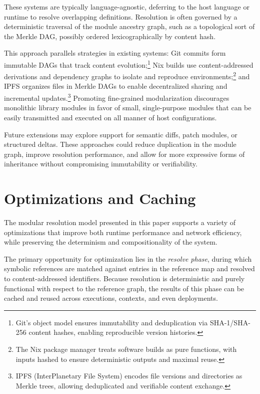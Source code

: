 \documentclass[sigplan,screen]{acmart}
\begin{document}
These systems are typically language-agnostic, deferring to the host language or runtime to resolve overlapping definitions. Resolution is often governed by a deterministic traversal of the module ancestry graph, such as a topological sort of the Merkle DAG, possibly ordered lexicographically by content hash.

This approach parallels strategies in existing systems: Git commits form immutable DAGs that track content evolution;\footnote{Git's object model ensures immutability and deduplication via SHA-1/SHA-256 content hashes, enabling reproducible version histories.} Nix builds use content-addressed derivations and dependency graphs to isolate and reproduce environments;\footnote{The Nix package manager treats software builds as pure functions, with inputs hashed to ensure deterministic outputs and maximal reuse.} and IPFS organizes files in Merkle DAGs to enable decentralized sharing and incremental updates.\footnote{IPFS (InterPlanetary File System) encodes file versions and directories as Merkle trees, allowing deduplicated and verifiable content exchange.} Promoting fine-grained modularization discourages monolithic library modules in favor of small, single-purpose modules that can be easily transmitted and executed on all manner of host configurations.

Future extensions may explore support for semantic diffs, patch modules, or structured deltas. These approaches could reduce duplication in the module graph, improve resolution performance, and allow for more expressive forms of inheritance without compromising immutability or verifiability.

\section{Optimizations and Caching}
\label{sec:optimizations}

The modular resolution model presented in this paper supports a variety of optimizations that improve both runtime performance and network efficiency, while preserving the determinism and compositionality of the system.

The primary opportunity for optimization lies in the \textit{resolve phase}, during which symbolic references are matched against entries in the reference map and resolved to content-addressed identifiers. Because resolution is deterministic and purely functional with respect to the reference graph, the results of this phase can be cached and reused across executions, contexts, and even deployments.
\end{document}
